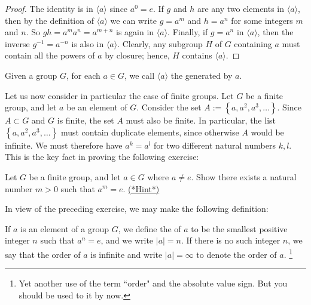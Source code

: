  \begin{proof}
The identity is in $\langle a \rangle $ since $a^0 = e$. If $g$ and
$h$ are any two elements in $\langle a \rangle $, then by the
definition of $\langle a \rangle$ we can write $g = a^m$ and $h = a^n$
for some integers $m$ and $n$. So $gh = a^m a^n = a^{m+n}$ is again in
$\langle a \rangle $. Finally, if $g = a^n$ in $\langle a \rangle $,
then the inverse $g^{-1} = a^{-n}$ is also in $\langle a \rangle $.
Clearly, any subgroup $H$ of $G$ containing $a$ must contain all the
powers of $a$ by closure; hence, $H$ contains $\langle a \rangle $.
\end{proof}
 
\medskip
\begin{defn}\label{defn_cyclic_subgroup}
Given a group $G$, for each $a \in G$, we call $\langle a \rangle $ the  generated by $a$. 
\end{defn}
 
Let us now consider in particular the case of finite groups. Let $G$ be a finite group, and let $a$ be an element of $G$. Consider the set $A :=\left\{a, a^2, a^3, \ldots \right\}$. Since $A \subset G$ and $G$ is finite, the set $A$ must also be finite. In particular, the list 
$\left\{a, a^2, a^3, \ldots\right\}$ must contain duplicate elements, since otherwise $A$ would be infinite. We must therefore have $a^k = a^l$ for two different natural numbers $k,l$. This is the key fact in proving the following exercise:

\begin{exercise}{90}
Let $G$ be a finite group, and let $a \in G$ where $a \neq e$. Show there exists a natural number $m>0$ such that $a^m = e$.
\hyperref[sec:groups:hints]{(*Hint*)}
\end{exercise}
In view of the preceding exercise, we may make the following definition:

\begin{defn}\label{DefOrder}
If $a$ is an element of a group $G$, we define the  of $a$ to be the smallest positive integer $n$ such that $a^n= e$,
and we write $|a| = n$\label{noteelementorder}. If there is no such
integer $n$, we say that the order of $a$ is infinite and  write $|a|
= \infty$ to denote the order of $a$. \footnote{Yet another use of the term ``order" and the absolute value sign.  But you should be used to it by now.}
\end{defn} 

